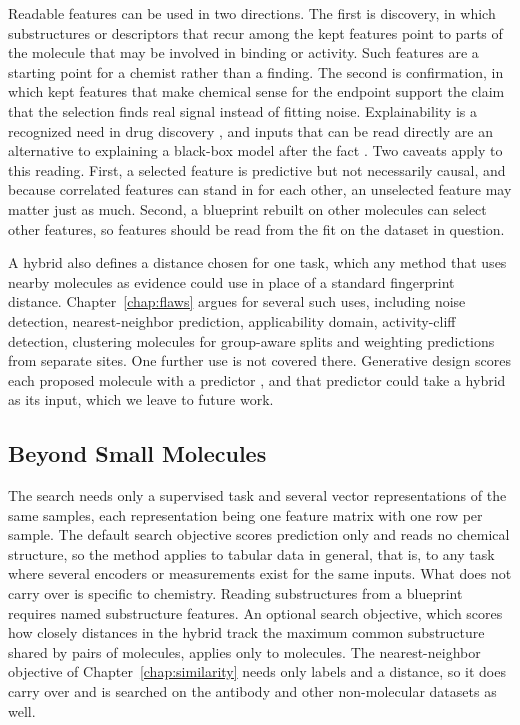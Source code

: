 Readable features can be used in two directions. The first is discovery, in which substructures or descriptors that recur among the kept features point to parts of the molecule that may be involved in binding or activity. Such features are a starting point for a chemist rather than a finding. The second is confirmation, in which kept features that make chemical sense for the endpoint support the claim that the selection finds real signal instead of fitting noise. Explainability is a recognized need in drug discovery \citep{JimenezLuna2020}, and inputs that can be read directly are an alternative to explaining a black-box model after the fact \citep{Rudin2019}. Two caveats apply to this reading. First, a selected feature is predictive but not necessarily causal, and because correlated features can stand in for each other, an unselected feature may matter just as much. Second, a blueprint rebuilt on other molecules can select other features, so features should be read from the fit on the dataset in question.

A hybrid also defines a distance chosen for one task, which any method that uses nearby molecules as evidence could use in place of a standard fingerprint distance. Chapter~\ref{chap:flaws} argues for several such uses, including noise detection, nearest-neighbor prediction, applicability domain, activity-cliff detection, clustering molecules for group-aware splits and weighting predictions from separate sites. One further use is not covered there. Generative design scores each proposed molecule with a predictor \citep{Olivecrona2017}, and that predictor could take a hybrid as its input, which we leave to future work.


\subsection{Beyond Small Molecules}

The search needs only a supervised task and several vector representations of the same samples, each representation being one feature matrix with one row per sample. The default search objective scores prediction only and reads no chemical structure, so the method applies to tabular data in general, that is, to any task where several encoders or measurements exist for the same inputs. What does not carry over is specific to chemistry. Reading substructures from a blueprint requires named substructure features. An optional search objective, which scores how closely distances in the hybrid track the maximum common substructure shared by pairs of molecules, applies only to molecules. The nearest-neighbor objective of Chapter~\ref{chap:similarity} needs only labels and a distance, so it does carry over and is searched on the antibody and other non-molecular datasets as well.

